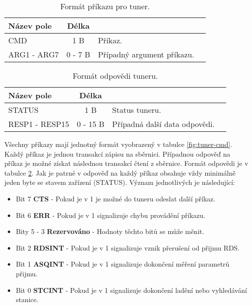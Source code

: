 \begin{table}[ht!]
\begin{center}
\begin{tabular}{|l|c|l|l|}
\hline 
Název pole & Délka &  \\ 
\hline
CMD & 1 B & Příkaz.\\
\hline
ARG1 - ARG7 & 0 - 7 B & Případný argument příkazu.\\
\hline
\end{tabular} 
\end{center}
\caption{Formát příkazu pro tuner.}
\label{tab:tuner-cmd} 
\end{table}

\begin{table}[ht!]
\begin{center}
\begin{tabular}{|l|c|l|l|}
\hline 
Název pole & Délka &  \\ 
\hline
STATUS & 1 B & Status tuneru.\\
\hline
RESP1 - RESP15 & 0 - 15 B & Případná další data odpovědi.\\
\hline
\end{tabular} 
\end{center}
\caption{Formát odpovědi tuneru.}
\label{tab:tuner-rpl} 
\end{table}

Všechny příkazy mají jednotný formát vyobrazený v tabulce \ref{fig:tuner-cmd}. Každý příkaz je jednou transakcí zápisu na \iic sběrnici. Případnou odpověď na příkaz je možné získat následnou transakcí čtení z \iic sběrnice. Formát odpovědi je v tabulce \ref{tab:tuner-rpl}. Jak je patrné v odpověď na každý příkaz obsahuje vždy minimálně jeden byte se stavem zařízení (STATUS). Význam jednotlivých je následující:

\begin{itemize}
\item Bit 7 \textbf{CTS} - Pokud je v 1 je možné do tuneru odeslat další příkaz.
\item Bit 6 \textbf{ERR} - Pokud je v 1 signalizuje chybu provádění příkazu.
\item Bity 5 - 3 \textbf{Rezervováno} - Hodnoty těchto bitů se může měnit.
\item Bit 2 \textbf{RDSINT} - Pokud je v 1 signalizuje vznik přerušení od přijmu RDS.
\item Bit 1 \textbf{ASQINT} - Pokud je v 1 signalizuje dokončení měření parametrů přijmu.
\item Bit 0 \textbf{STCINT} - Pokud je v 1 signalizuje dokončení ladění nebo vyhledávání stanice.
\end{itemize}  

